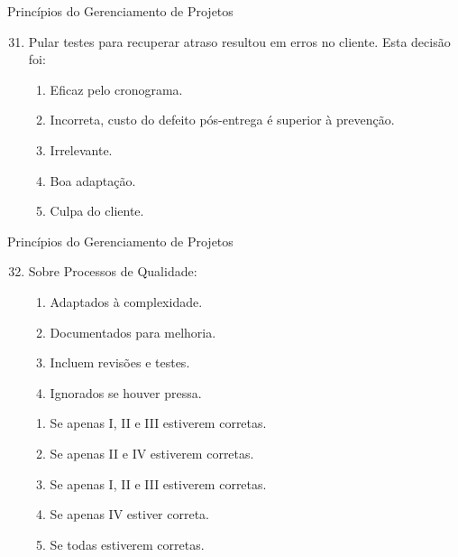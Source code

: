 \documentclass{beamer}
\begin{document}
\begin{frame}{Princípios do Gerenciamento de Projetos}
	\begin{enumerate}
		\setcounter{enumi}{30}
		\justifying
		\item Pular testes para recuperar atraso resultou em erros no cliente. Esta decisão foi:
		\begin{enumerate}[a]
			\item Eficaz pelo cronograma.
			\item \alert<2>{Incorreta, custo do defeito pós-entrega é superior à prevenção.}
			\item Irrelevante.
			\item Boa adaptação.
			\item Culpa do cliente.
		\end{enumerate}
	\end{enumerate}
\end{frame}

\begin{frame}{Princípios do Gerenciamento de Projetos}
	\begin{enumerate}
		\setcounter{enumi}{31}
		\justifying
		\item Sobre Processos de Qualidade:
		\begin{enumerate}[I]
			\item Adaptados à complexidade.
			\item Documentados para melhoria.
			\item Incluem revisões e testes.
			\item Ignorados se houver pressa.
		\end{enumerate}
		\begin{enumerate}[a]
			\item Se apenas I, II e III estiverem corretas.
			\item Se apenas II e IV estiverem corretas.
			\item \alert<2>{Se apenas I, II e III estiverem corretas.}
			\item Se apenas IV estiver correta.
			\item Se todas estiverem corretas.
		\end{enumerate}
	\end{enumerate}
\end{frame}
\end{document}
